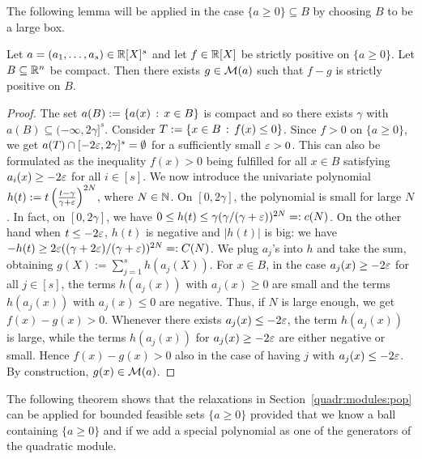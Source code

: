 The following lemma will be applied in the case $\{a \ge 0 \} \subseteq B$ by choosing $B$ to be a large box. 
\begin{lemma} \label{lem:transfer}
	Let $a=(a_1,\ldots,a_s) \in \mathbb{R}[X]^s$ and let $f \in \mathbb{R}[X]$ be strictly positive on $\{a \ge 0\}$. Let $B \subseteq \mathbb{R}^n$ be compact. Then there exists $g \in \mathcal{M}(a)$ such that $f - g $ is strictly positive on $B$. 
\end{lemma}
\begin{proof}
	The set $a(B):= \left\{ a(x) \,:\, x \in B \right\}$ is compact and so there exists $\gamma$ with $a(B) \subseteq (-\infty, 2 \gamma]^s$. Consider $T:= \left\{ x \in B \,:\, f(x) \le 0 \right\}$. Since $f> 0$ on $\{a \ge 0\}$, we get $a(T) \cap [-2 {\operatorname{\varepsilon}}, 2 \gamma]^s = \emptyset$ for a sufficiently small ${\operatorname{\varepsilon}}>0$. This can also be formulated as the inequality $f(x) > 0$ being fulfilled for all $x \in B$ satisfying $a_i(x) \ge -2 {\operatorname{\varepsilon}}$ for all $i \in [s]$. We now introduce the univariate polynomial $h(t) := t \left( \frac{t - \gamma}{\gamma + {\operatorname{\varepsilon}}} \right)^{2N}$, where $N \in \mathbb{N}$. On $[0,2\gamma]$, the polynomial is small for large $N$. In fact, on $[0,2\gamma]$, we have $0 \le h(t) \le \gamma (\gamma / (\gamma+{\operatorname{\varepsilon}}))^{2N}=:c(N)$. On the other hand when $t \le - 2 {\operatorname{\varepsilon}}$,  $h(t)$ is negative and $|h(t)|$ is big: we have $- h (t) \ge 2 {\operatorname{\varepsilon}} ((\gamma + 2 {\operatorname{\varepsilon}})/ (\gamma+{\operatorname{\varepsilon}}))^{2N}=:C(N)$.  We plug $a_j$'s into $h$ and take the sum, obtaining $g(X) := \sum_{j=1}^s h(a_j(X))$. For $x \in B$, in the case $a_j(x) \ge - 2 {\operatorname{\varepsilon}}$ for all $j \in [s]$, the terms $h(a_j(x))$ with $a_j(x) \ge 0$ are small and the terms $h(a_j(x))$ with $a_j(x) \le 0$ are negative. Thus, if $N$ is large enough, we get $f(x) - g(x) > 0$. Whenever there exists $a_j(x) \le - 2 {\operatorname{\varepsilon}}$, the term $h(a_j(x))$ is large, while the terms $h(a_j(x))$ for $a_j(x) \ge - 2 {\operatorname{\varepsilon}}$ are either negative or small. Hence $f(x) - g(x) > 0$ also in the case of having $j$ with $a_j(x) \le - 2 {\operatorname{\varepsilon}}$. By construction, $g(x) \in \mathcal{M}(a)$. 
\end{proof}

The following theorem shows that the relaxations in Section~\ref{quadr:modules:pop} can be applied for bounded feasible sets $\{a \ge 0\}$ provided that we know a ball containing $\{a \ge 0\}$ and if we add a special polynomial as one of the generators of the quadratic module. 

